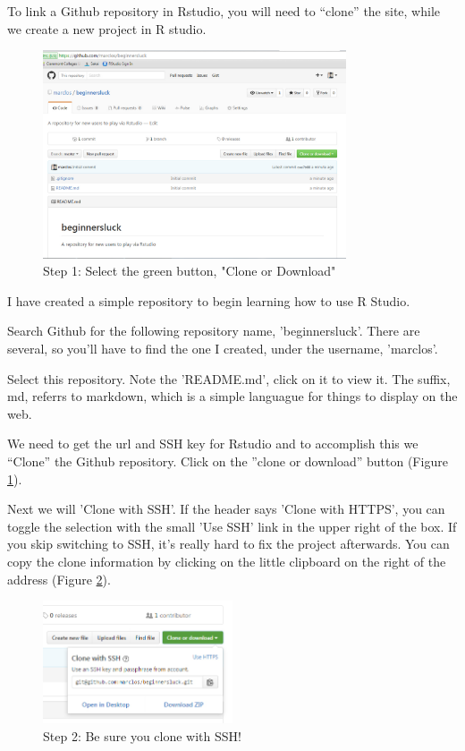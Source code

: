 \documentclass[12pt]{../SOP4_alpha}\usepackage[]{graphicx}\usepackage[]{color}
\begin{document}
\NP To link a Github repository in Rstudio, you will need to ``clone'' the site, while we create a new project in R studio.


\begin{figure}[H]
\centering
\includegraphics[width=0.8\textwidth]{graphics/CloningGithub.jpg}
\caption{Step 1: Select the green button, "Clone or Download"}
\label{fig:step1}
\end{figure}

\NP I have created a simple repository to begin learning how to use R Studio.

\NP Search Github for the following repository name, 'beginnersluck'. There are several, so you'll have to find the one I created, under the username, 'marclos'. 

\NP Select this repository. Note the 'README.md', click on it to view it. The suffix, md, referrs to markdown, which is a simple languague for things to display on the web.

\NP We need to get the url and SSH key for Rstudio and to accomplish this we ``Clone'' the Github repository. Click on the ''clone or download'' button (Figure \ref{fig:step1}).


\NP Next we will 'Clone with SSH'. If the header says 'Clone with HTTPS', you can toggle the selection with the small 'Use SSH' link in the upper right of the box. If you skip switching to SSH, it's really hard to fix the project afterwards. You can copy the clone information by clicking on the little clipboard on the right of the address (Figure \ref{fig:step2}).

\begin{figure}[H]
\centering
\includegraphics[width=0.5\textwidth]{graphics/CloningGithub2.jpg}
\caption{Step 2: Be sure you clone with SSH!}
\label{fig:step2}
\end{figure}
\end{document}
